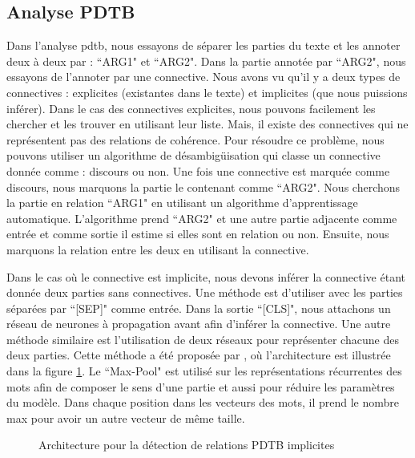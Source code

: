 \documentclass{KodeBook}
\begin{document}
\subsection{Analyse PDTB}

Dans l'analyse \ac{pdtb}, nous essayons de séparer les parties du texte et les annoter deux à deux par : ``ARG1" et ``ARG2". 
Dans la partie annotée par ``ARG2", nous essayons de l'annoter par une connective. 
Nous avons vu qu'il y a deux types de connectives : explicites (existantes dans le texte) et implicites (que nous puissions inférer). 
Dans le cas des connectives explicites, nous pouvons facilement les chercher et les trouver en utilisant leur liste. 
Mais, il existe des connectives qui ne représentent pas des relations de cohérence. 
Pour résoudre ce problème, nous pouvons utiliser un algorithme de désambigüisation qui classe un connective donnée comme : discours ou non. 
Une fois une connective est marquée comme discours, nous marquons la partie le contenant comme ``ARG2". 
Nous cherchons la partie en relation ``ARG1" en utilisant un algorithme d'apprentissage automatique. 
L'algorithme prend ``ARG2" et une autre partie adjacente comme entrée et comme sortie il estime si elles sont en relation ou non. 
Ensuite, nous marquons la relation entre les deux en utilisant la connective. 

Dans le cas où le connective est implicite, nous devons inférer la connective étant donnée deux parties sans connectives. 
Une méthode est d'utiliser  avec les parties séparées par ``[SEP]" comme entrée. 
Dans la sortie ``[CLS]", nous attachons un réseau de neurones à propagation avant afin d'inférer la connective.
Une autre méthode similaire est l'utilisation de deux réseaux  pour représenter chacune des deux parties. 
Cette méthode a été proposée par \citet{2020-liang-al}, où l'architecture est illustrée dans la figure \ref{fig:pdtb-liang}.
Le ``Max-Pool" est utilisé sur les représentations récurrentes des mots afin de composer le sens d'une partie et aussi pour réduire les paramètres du modèle.
Dans chaque position dans les vecteurs des mots, il prend le nombre max pour avoir un autre vecteur de même taille.

\begin{figure}[!ht]
	\centering
	\caption[Architecture pour la détection de relations PDTB implicites]{Architecture pour la détection de relations PDTB implicites \cite{2020-liang-al}}
	\label{fig:pdtb-liang}
\end{figure}
\end{document}

